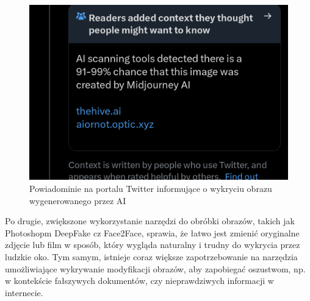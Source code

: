 \begin{figure}
    \includegraphics[width=\linewidth]{img/twitter}
    \centering
    \caption{ Powiadominie na portalu Twitter informujące o wykryciu obrazu wygenerowanego przez AI}
    \label{img:twitter-notification}
\end{figure}

Po drugie, zwiększone wykorzystanie narzędzi do obróbki obrazów, takich jak Photoshopm DeepFake cz Face2Face, sprawia, że łatwo jest zmienić oryginalne zdjęcie lub film w sposób, który wygląda naturalny i trudny do wykrycia przez ludzkie oko.
Tym samym, istnieje coraz większe zapotrzebowanie na narzędzia umożliwiające wykrywanie modyfikacji obrazów, aby zapobiegać oszustwom, np.
w kontekście fałszywych dokumentów, czy nieprawdziwych informacji w internecie.

